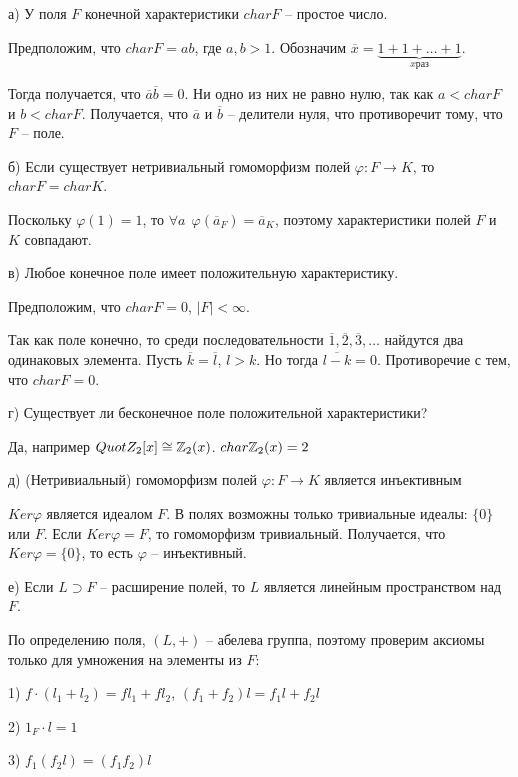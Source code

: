а) У поля $F$ конечной характеристики $char F$ -- простое число.

Предположим, что $char F = ab$, где $a, b > 1$. Обозначим
$\overline{x} = \underbrace{1 + 1 + \dots + 1}_{x раз}$.

Тогда получается, что $\overline{a} \overline{b} = 0$.
Ни одно из них не равно нулю, так как $a < char F$ и $b < char F$.
Получается, что $\overline{a}$ и $\overline{b}$ -- делители нуля, что
противоречит тому, что $F$ -- поле.

б) Если существует нетривиальный гомоморфизм полей 
$\varphi: F \to K$, то $char F = char K$.

Поскольку $\varphi(1) = 1$, то 
$\forall a \ \ \varphi(\overline{a}_F) = \overline{a}_K$,
поэтому характеристики полей $F$ и $K$ совпадают. 

в) Любое конечное поле имеет положительную характеристику.

Предположим, что $char F = 0$, $|F| < \infty$.

Так как поле конечно, то среди последовательности 
$\overline{1}, \overline{2}, \overline{3}, \dots$ найдутся два
одинаковых элемента. Пусть $\overline{k} = \overline{l}$, $l > k$.
Но тогда $\overline{l - k} = 0$. Противоречие с тем, что $char F = 0$.

г) Существует ли бесконечное поле положительной характеристики?

Да, например $Quot Z_2[x] \cong \mathbb{Z}_2(x)$. $char \mathbb{Z}_2(x) = 2$

д) (Нетривиальный) гомоморфизм полей $\varphi: F \to K$ является инъективным

$Ker \varphi$ является идеалом $F$. В полях возможны только тривиальные идеалы:
$\{0\}$ или $F$. Если $Ker \varphi = F$, то гомоморфизм тривиальный.
Получается, что $Ker \varphi = \{0\}$, то есть $\varphi$ -- инъективный.

е) Если $L \supset F$ -- расширение полей, 
то $L$ является линейным пространством над $F$.

По определению поля, $(L, +)$ -- абелева группа, поэтому проверим
аксиомы только для умножения на элементы из $F$:

1) $f \cdot (l_1 + l_2) = f l_1 + f l_2$, 
$(f_1 + f_2) l = f_1 l + f_2 l$

2) $1_F \cdot l = 1$

3) $f_1 (f_2 l) = (f_1 f_2) l$
